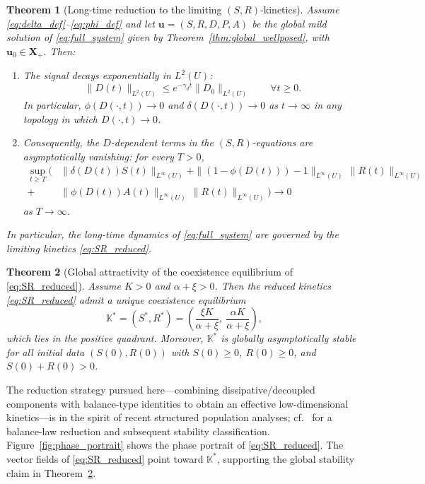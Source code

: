 \documentclass[pdflatex,sn-mathphys-ay]{sn-jnl}
\theoremstyle{thmstyleone}
\newtheorem{theorem}{Theorem}[section]
\theoremstyle{definition}
\theoremstyle{remark}
\begin{document}
\begin{theorem}[Long-time reduction to the limiting $(S,R)$-kinetics]
\label{thm:longtime_reduction}
Assume \eqref{eq:delta_def}--\eqref{eq:phi_def} and let $\mathbf{u}=(S,R,D,P,A)$ be the global mild solution of
\eqref{eq:full_system} given by Theorem~\ref{thm:global_wellposed}, with $\mathbf{u}_0\in\mathbf{X}_+$.
Then:
\begin{enumerate}[label=(\roman*), leftmargin=*]
\item The signal decays exponentially in $L^2(U)$:
\[
\|D(t)\|_{L^2(U)}\le e^{-\gamma_d t}\|D_0\|_{L^2(U)}\qquad \forall t\ge0.
\]
In particular, $\phi(D(\cdot,t))\to0$ and $\delta(D(\cdot,t))\to0$ as $t\to\infty$ in any topology in which $D(\cdot,t)\to0$.
\item Consequently, the $D$-dependent terms in the $(S,R)$-equations are asymptotically vanishing:
for every $T>0$,
\begin{equation*}
\begin{aligned}
\sup_{t\ge T}\bigg(
&\|\delta(D(t))S(t)\|_{L^\infty(U)}
+\|(1-\phi(D(t)))-1\|_{L^\infty(U)}\,\|R(t)\|_{L^\infty(U)} \\[4pt]
+&\|\phi(D(t))A(t)\|_{L^\infty(U)}\,\|R(t)\|_{L^\infty(U)}
\Big)\longrightarrow 0
\end{aligned}
\end{equation*}
as $T\to\infty$.
\end{enumerate}
In particular, the long-time dynamics of \eqref{eq:full_system} are governed by the limiting kinetics \eqref{eq:SR_reduced}.
\end{theorem}

\begin{theorem}[Global attractivity of the coexistence equilibrium of \eqref{eq:SR_reduced}]
\label{thm:global_attract_reduced}
Assume $K>0$ and $\alpha+\xi>0$. Then the reduced kinetics \eqref{eq:SR_reduced} admit a unique coexistence equilibrium
\begin{equation}
\label{eq:Kstar_reduced}
\mathbb{K}^{*}=(S^{*},R^{*})
=\left(\frac{\xi K}{\alpha+\xi},\ \frac{\alpha K}{\alpha+\xi}\right),
\end{equation}
which lies in the positive quadrant. Moreover, $\mathbb{K}^{*}$ is globally asymptotically stable for all initial data
$(S(0),R(0))$ with $S(0)\ge0$, $R(0)\ge0$, and $S(0)+R(0)>0$.
\end{theorem}

The reduction strategy pursued here---combining dissipative/decoupled components with balance-type identities to obtain an effective low-dimensional kinetics---is in the spirit of recent structured population analyses; cf.\ \citep{liang_global_2025} for a balance-law reduction and subsequent stability classification.
Figure~\ref{fig:phase_portrait} shows the phase portrait of \eqref{eq:SR_reduced}. The vector fields of \eqref{eq:SR_reduced} point toward $\mathbb K^*$, supporting the global stability claim in Theorem~\ref{thm:global_attract_reduced}.
\end{document}
